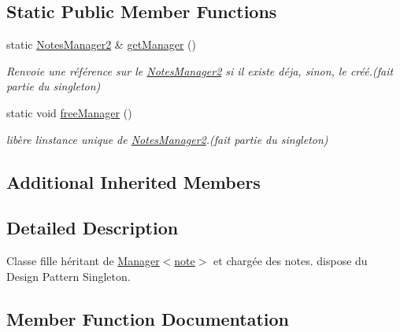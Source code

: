 \subsection*{Static Public Member Functions}
\begin{DoxyCompactItemize}
\item 
\mbox{\label{class_notes_manager2_a392bc750d869bacbe50337531213f248}} 
static \hyperlink{class_notes_manager2}{Notes\+Manager2} \& \hyperlink{class_notes_manager2_a392bc750d869bacbe50337531213f248}{get\+Manager} ()
\begin{DoxyCompactList}\small\item\em Renvoie une référence sur le \hyperlink{class_notes_manager2}{Notes\+Manager2} si il existe déja, sinon, le créé.(fait partie du singleton) \end{DoxyCompactList}\item 
\mbox{\label{class_notes_manager2_abdc16834a0e2ab7c8b3937674c725a0d}} 
static void \hyperlink{class_notes_manager2_abdc16834a0e2ab7c8b3937674c725a0d}{free\+Manager} ()
\begin{DoxyCompactList}\small\item\em libère l\textquotesingle{}instance unique de \hyperlink{class_notes_manager2}{Notes\+Manager2}.(fait partie du singleton) \end{DoxyCompactList}\end{DoxyCompactItemize}
\subsection*{Additional Inherited Members}


\subsection{Detailed Description}
Classe fille héritant de \hyperlink{class_manager}{Manager$<$note$>$} et chargée des notes. dispose du Design Pattern Singleton. 

\subsection{Member Function Documentation}
\mbox{\label{class_notes_manager2_a53819d123894c31bbbab66b3d0bf0ff0}} 
